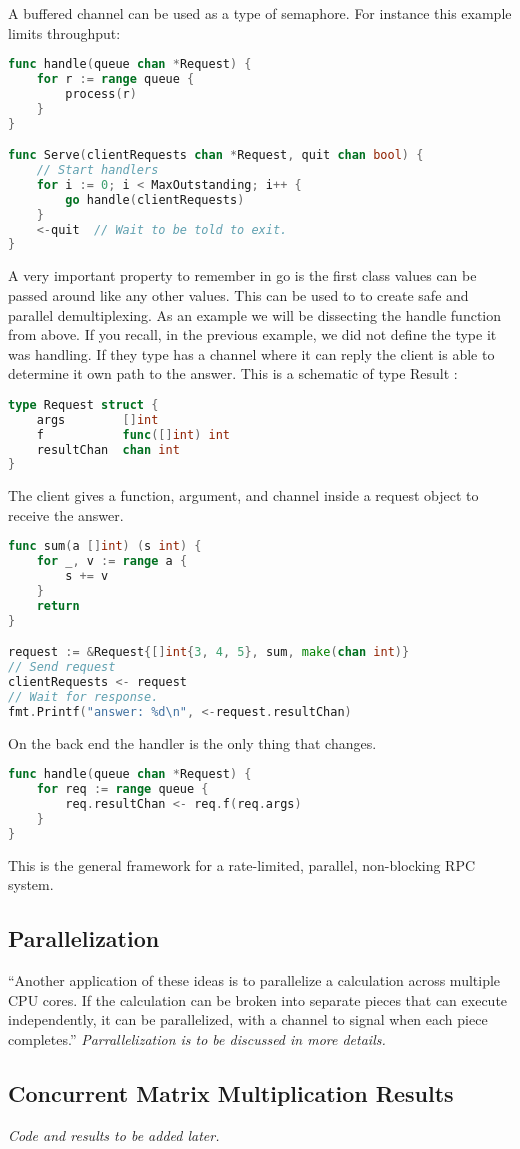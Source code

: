 	A buffered channel can be used as a type of semaphore. For instance this example limits throughput:
\begin{lstlisting}[language=Go]
func handle(queue chan *Request) {
    for r := range queue {
        process(r)
    }
}

func Serve(clientRequests chan *Request, quit chan bool) {
    // Start handlers
    for i := 0; i < MaxOutstanding; i++ {
        go handle(clientRequests)
    }
    <-quit  // Wait to be told to exit.
} 
\end{lstlisting}
A very important property to remember in go is the first class values can be passed around like any other values. This can be used to to create safe and parallel demultiplexing. As an example we will be dissecting the handle function from above. If you recall, in the previous example, we did not define the type it was handling. If they type has a channel where it can reply the client is able to determine it own path to the answer. This is a schematic of type Result :
\begin{lstlisting}[language=Go]
type Request struct {
    args        []int
    f           func([]int) int
    resultChan  chan int
} 
\end{lstlisting}
The client gives a function, argument, and channel inside a request object to receive the answer.
\begin{lstlisting}[language=Go]
func sum(a []int) (s int) {
    for _, v := range a {
        s += v
    }
    return
}

request := &Request{[]int{3, 4, 5}, sum, make(chan int)}
// Send request
clientRequests <- request
// Wait for response.
fmt.Printf("answer: %d\n", <-request.resultChan)
\end{lstlisting}
On the back end the handler is the only thing that changes. 
\begin{lstlisting}[language=Go]
func handle(queue chan *Request) {
    for req := range queue {
        req.resultChan <- req.f(req.args)
    }
} 
\end{lstlisting}
This is the general framework for a rate-limited, parallel, non-blocking RPC system.
\subsection{Parallelization}
“Another application of these ideas is to parallelize a calculation across multiple CPU cores. If the calculation can be broken into separate pieces that can execute independently, it can be parallelized, with a channel to signal when each piece completes.”\cite{website:go-lang-documentation}
\emph{Parrallelization is to be discussed in more details.}
\subsection{Concurrent Matrix Multiplication Results}
\emph{Code and results to be added later.}

